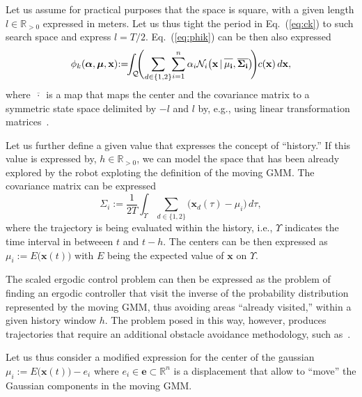 \documentclass[letterpaper,10pt,conference,twoside]{IEEEtran}
\theoremstyle{definition}
\begin{document}
Let us assume for practical purposes that the space is square, with a given length $l\in\mathbb{R}_{>0}$ expressed in meters.
Let us thus tight the period in Eq.~(\ref{eq:ck}) to such search space and express $l=T/2$. Eq.~(\ref{eq:phik}) can be then also expressed
\begin{equation}
  \phi_k(\boldsymbol{\alpha},\boldsymbol{\mu},\mathbf{x})\hspace*{-.6ex}:=\hspace*{-1ex}\int_{\mathcal{Q}}{\hspace*{-1ex}\Bigg(\hspace*{-.3ex}\sum_{d\in\{1,2\}}\hspace*{-.5ex}\sum_{i=1}^n\alpha_i\mathcal{N}_i\big(\mathbf{x\,|\,\overline{\rule{0pt}{2.4mm}{\mu_i}},\overline{\Sigma_i}}\big)\hspace*{-.5ex}\Bigg)\hspace*{-.1ex}c(\mathbf{x})\,d\mathbf{x}},
\end{equation}
where $\overline{\,\cdot\,}$ is a map that maps the center and the covariance matrix to a symmetric state space delimited by $-l$ and $l$ by, e.g., using linear transformation matrices~\cite{calinon2020mixture}.

Let us further define a given value that expresses the concept of ``history.'' If this value is expressed by, $h\in\mathbb{R}_{>0}$, we can model the space that has been already explored by the robot exploting the definition of the moving GMM. The covariance matrix can be expressed
\begin{equation}
  \Sigma_i:=\frac{1}{2T}\int_\Upsilon\sum_{d\in\{1,2\}}{\big(\mathbf{x}_d(\tau)-\mu_i\big)}\,d\tau,
\end{equation}
where the trajectory is being evaluated within the history, i.e., $\Upsilon$ indicates the time interval in betweeen $t$ and $t-h$.
%
The centers can be then expressed as $\mu_i:=E\big(\mathbf{x}(t)\big)$ with $E$ being the expected value of $\mathbf{x}$ on $\Upsilon$. 

The scaled ergodic control problem can then be expressed as the problem of finding an ergodic controller that visit the inverse of the probability distribution represented by the moving GMM, thus avoiding areas ``already visited,'' within a given history window $h$. The problem posed in this way, however, produces trajectories that require an additional obstacle avoidance methodology, such as~\cite{lerch2023safety}.

Let us thus consider a modified expression for the center of the gaussian $\mu_i:=E\big(\mathbf{x}(t)\big)-e_i$ where $e_i\in\mathbf{e}\subset\mathbb{R}^n$ is a displacement that allow to ``move'' the Gaussian components in the moving GMM. 
\end{document}
